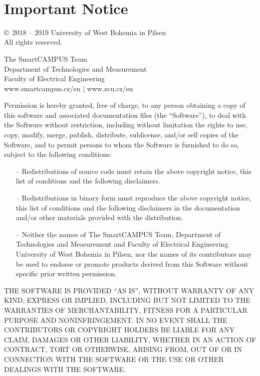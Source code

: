 %
%
%

\clearpage

~

\vfill

\section*{Important Notice}

\copyright ~2018 -- 2019 University of West Bohemia in Pilsen\\
All rights reserved.

The SmartCAMPUS Team\\
Department of Technologies and Measurement\\
Faculty of Electrical Engineering\\
www.smartcampus.cz/en $\mid$ www.zcu.cz/en


Permission is hereby granted, free of charge, to any person obtaining a copy of this software and associated documentation files (the “Software”), to deal with the Software without restriction, including without limitation the rights to use, copy, modify, merge, publish, distribute, sublicense, and/or sell copies of the Software, and to permit persons to whom the Software is furnished to do so, subject to the following conditions:

\begin{itemize}
    \item[--] Redistributions of source code must retain the above copyright notice, this list of conditions and the following disclaimers.
    \item[--] Redistributions in binary form must reproduce the above copyright notice, this list of conditions and the following disclaimers in the documentation and/or other materials provided with the distribution.
    \item[--] Neither the names of The SmartCAMPUS Team, Department of Technologies and Measurement and Faculty of Electrical Engineering University of West Bohemia in Pilsen, nor the names of its contributors may be used to endorse or promote products derived from this Software without specific prior written permission. 
\end{itemize}
THE SOFTWARE IS PROVIDED “AS IS”, WITHOUT WARRANTY OF ANY KIND, EXPRESS OR IMPLIED, INCLUDING BUT NOT LIMITED TO THE WARRANTIES OF MERCHANTABILITY, FITNESS FOR A PARTICULAR PURPOSE AND NONINFRINGEMENT. IN NO EVENT SHALL THE CONTRIBUTORS OR COPYRIGHT HOLDERS BE LIABLE FOR ANY CLAIM, DAMAGES OR OTHER LIABILITY, WHETHER IN AN ACTION OF CONTRACT, TORT OR OTHERWISE, ARISING FROM, OUT OF OR IN CONNECTION WITH THE SOFTWARE OR THE USE OR OTHER DEALINGS WITH THE SOFTWARE. 


